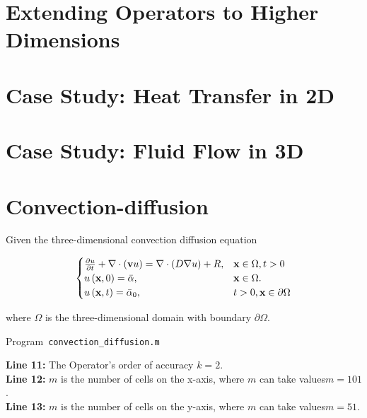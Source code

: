 \section{Extending Operators to Higher Dimensions}
\section{Case Study: Heat Transfer in 2D}
\section{Case Study: Fluid Flow in 3D}

\section{Convection-diffusion}
Given the three-dimensional convection diffusion equation

\begin{equation}\label{eq:IBVP3d}
    \begin{cases}
        \diffp{u}{t} + \nabla \cdot (\textbf{v} u) = \nabla \cdot (D \nabla u) + R,
                                      & \textbf{x} \in \Omega, t > 0     \\
        u\left( \textbf{x},0\right)= \bar{\alpha},
                                      & \textbf{x} \in  \Omega.\\
        u\left(\textbf{x},t\right)= \bar{\alpha}_{0}, & t >0, \textbf{x} \in \partial  \Omega
    \end{cases}
\end{equation}

where  $\Omega$  is the three-dimensional domain with  boundary $\partial  \Omega $.

\begin{listing}[ht!]
    \tiny
    \centering
    \caption{Program~\texttt{convection\_diffusion.m}}
    \label{code:convection_diffusion.m}
\end{listing}

\textbf{Line 11:} The Operator's order of accuracy $k = 2$.\\

\textbf{Line 12:} $m$ is the number of cells on the x-axis, where $m$ can take values ​​$m= 101$.\\

\textbf{Line 13:} $m$ is the number of cells on the y-axis, where $m$ can take values ​​$m= 51$.\\


